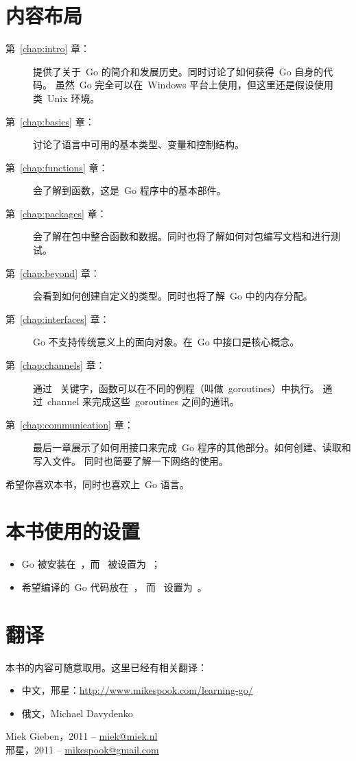 \section*{内容布局}
\begin{description}
\item[第~\ref{chap:intro} 章：]
提供了关于~Go 的简介和发展历史。同时讨论了如何获得~Go 自身的代码。
虽然~Go 完全可以在~Windows 平台上使用，但这里还是假设使用类~Unix 环境。

\item[第~\ref{chap:basics} 章：]
讨论了语言中可用的基本类型、变量和控制结构。

\item[第~\ref{chap:functions} 章：]
会了解到函数，这是~Go 程序中的基本部件。

\item[第~\ref{chap:packages} 章：]
会了解在包中整合函数和数据。同时也将了解如何对包编写文档和进行测试。

\item[第~\ref{chap:beyond} 章：]
会看到如何创建自定义的类型。同时也将了解~Go 中的内存分配。

\item[第~\ref{chap:interfaces} 章：]
Go 不支持传统意义上的面向对象。在~Go 中接口是核心概念。

\item[第~\ref{chap:channels} 章：]
通过~ 关键字，函数可以在不同的例程（叫做~goroutines）中执行。
通过~channel 来完成这些~goroutines 之间的通讯。

\item[第~\ref{chap:communication} 章：]
最后一章展示了如何用接口来完成~Go 程序的其他部分。如何创建、读取和写入文件。
同时也简要了解一下网络的使用。
\end{description}

希望你喜欢本书，同时也喜欢上~Go 语言。

\section{本书使用的设置}
\label{sec:settings used}
\begin{itemize}                            
\item Go 被安装在~，而~ 被设置为~；
\item 希望编译的~Go 代码放在~， 
而~ 设置为~。
\end{itemize}

\section*{翻译}
本书的内容可随意取用。这里已经有相关翻译：
\begin{itemize}
\item 中文，邢星：\url{http://www.mikespook.com/learning-go/}
\item 俄文，Michael Davydenko
\end{itemize}

\begin{raggedright}
Miek Gieben，2011 -- \url{miek@miek.nl}\\
邢星，2011 -- \url{mikespook@gmail.com}
\end{raggedright}
